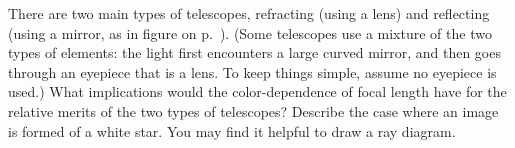 There are two main types of telescopes, refracting (using
a lens) and reflecting (using a mirror, as in figure 
on p.~\pageref{fig:newtonian-telescope-eye}). (Some telescopes
use a mixture of the two types of elements: the light first
encounters a large curved mirror, and then goes through an
eyepiece that is a lens. To keep things simple, assume no eyepiece is used.) What implications would the
color-dependence of focal length have for the relative
merits of the two types of telescopes? Describe the case
where an image is formed of a white star. You may find
it helpful to draw a ray diagram.
